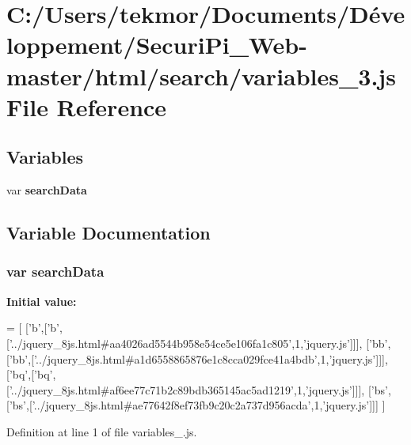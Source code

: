\section{C\+:/\+Users/tekmor/\+Documents/\+Développement/\+Securi\+Pi\+\_\+\+Web-\/master/html/search/variables\+\_\+3.js File Reference}
\label{variables__3_8js}
\subsection*{Variables}
\begin{DoxyCompactItemize}
\item 
var {\bf search\+Data}
\end{DoxyCompactItemize}


\subsection{Variable Documentation}
\subsubsection[{search\+Data}]{\setlength{\rightskip}{0pt plus 5cm}var search\+Data}\label{variables__3_8js_ad01a7523f103d6242ef9b0451861231e}
{\bfseries Initial value\+:}
\begin{DoxyCode}
=
[
  [\textcolor{charliteral}{'b'},[\textcolor{charliteral}{'b'},[\textcolor{stringliteral}{'../jquery\_8js.html#aa4026ad5544b958e54ce5e106fa1c805'},1,\textcolor{stringliteral}{'jquery.js'}]]],
  [\textcolor{stringliteral}{'bb'},[\textcolor{stringliteral}{'bb'},[\textcolor{stringliteral}{'../jquery\_8js.html#a1d6558865876e1c8cca029fce41a4bdb'},1,\textcolor{stringliteral}{'jquery.js'}]]],
  [\textcolor{stringliteral}{'bq'},[\textcolor{stringliteral}{'bq'},[\textcolor{stringliteral}{'../jquery\_8js.html#af6ee77c71b2c89bdb365145ac5ad1219'},1,\textcolor{stringliteral}{'jquery.js'}]]],
  [\textcolor{stringliteral}{'bs'},[\textcolor{stringliteral}{'bs'},[\textcolor{stringliteral}{'../jquery\_8js.html#ae77642f8ef73fb9c20c2a737d956acda'},1,\textcolor{stringliteral}{'jquery.js'}]]]
]
\end{DoxyCode}


Definition at line 1 of file variables\+\_.\+js.

